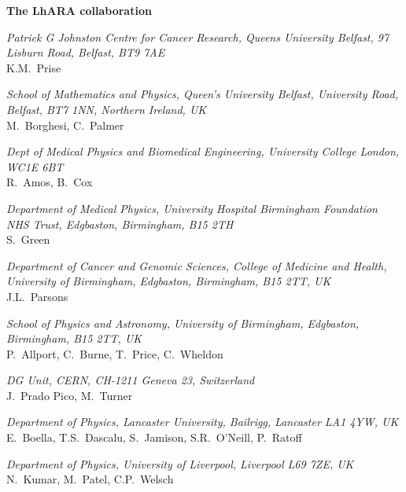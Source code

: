 \vspace{0.75cm}
\begin{center}
  {\bf \color{BlueViolet} The LhARA collaboration} \\
  \vspace{0.25cm}
\end{center}
\noindent \textit{Patrick G Johnston Centre for Cancer Research, Queens University Belfast, 97 Lisburn Road, Belfast, BT9 7AE} \\
K.M.~Prise
 
\vspace{0.5cm}
\noindent \textit{School of Mathematics and Physics, Queen's University Belfast, University Road, Belfast, BT7 1NN, Northern Ireland, UK} \\
M.~Borghesi, C.~Palmer
 
\vspace{0.5cm}
\noindent \textit{Dept of Medical Physics and Biomedical Engineering, University College London, WC1E 6BT} \\
R.~Amos, B.~Cox
 
\vspace{0.5cm}
\noindent \textit{Department of Medical Physics, University Hospital Birmingham Foundation NHS Trust, Edgbaston, Birmingham, B15 2TH} \\
S.~Green
 
\vspace{0.5cm}
\noindent \textit{Department of Cancer and Genomic Sciences, College of Medicine and Health, University of Birmingham, Edgbaston, Birmingham, B15 2TT, UK} \\
J.L.~Parsons
 
\vspace{0.5cm}
\noindent \textit{School of Physics and Astronomy, University of Birmingham, Edgbaston, Birmingham, B15 2TT, UK} \\
P.~Allport, C.~Burne, T.~Price, C.~Wheldon
 
\vspace{0.5cm}
\noindent \textit{DG Unit, CERN, CH-1211 Geneva 23, Switzerland} \\
J.~Prado Pico, M.~Turner
 
\vspace{0.5cm}
\noindent \textit{Department of Physics, Lancaster University, Bailrigg, Lancaster LA1 4YW, UK} \\
E.~Boella, T.S.~Dascalu, S.~Jamison, S.R.~O'Neill, P.~Ratoff
 
\vspace{0.5cm}
\noindent \textit{Department of Physics, University of Liverpool, Liverpool L69 7ZE, UK} \\
N.~Kumar, M.~Patel, C.P.~Welsch
 

